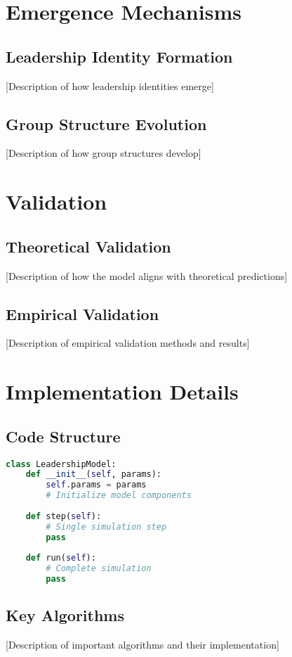 \documentclass[12pt]{article}
\begin{document}
\section{Emergence Mechanisms}
\subsection{Leadership Identity Formation}
[Description of how leadership identities emerge]

\subsection{Group Structure Evolution}
[Description of how group structures develop]

\section{Validation}
\subsection{Theoretical Validation}
[Description of how the model aligns with theoretical predictions]

\subsection{Empirical Validation}
[Description of empirical validation methods and results]

\section{Implementation Details}
\subsection{Code Structure}
\begin{lstlisting}[language=Python, caption=Core Model Class]
class LeadershipModel:
    def __init__(self, params):
        self.params = params
        # Initialize model components
        
    def step(self):
        # Single simulation step
        pass
        
    def run(self):
        # Complete simulation
        pass
\end{lstlisting}

\subsection{Key Algorithms}
[Description of important algorithms and their implementation]
\end{document}
